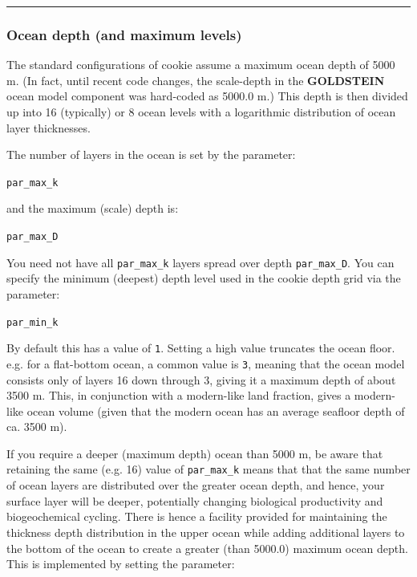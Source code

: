 \vspace{1mm}\noindent\rule{4cm}{0.5pt}\vspace{2mm}

\newpage

\subsubsection{Ocean depth (and maximum levels)}

The standard configurations of cookie assume a maximum ocean depth of 5000 m. (In fact, until recent code changes, the scale-depth in the \textbf{GOLDSTEIN} ocean model component was hard-coded as 5000.0 m.) This depth is then divided up into 16 (typically) or 8 ocean levels with a logarithmic distribution of ocean layer thicknesses.

The number of layers in the ocean is set by the parameter:

\vspace{1mm}
\texttt{par\_max\_k}
\vspace{1mm}

\noindent and the maximum (scale) depth is:

\vspace{1mm}
\texttt{par\_max\_D}
\vspace{1mm}

You need not have all \texttt{par\_max\_k} layers spread over depth \texttt{par\_max\_D}. You can specify the minimum (deepest) depth level used in the cookie depth grid via the parameter:

\vspace{1mm}
\texttt{par\_min\_k}
\vspace{1mm}

\noindent By default this has a value of \texttt{1}. Setting a high value truncates the ocean floor. e.g. for a flat-bottom ocean, a common value is \texttt{3}, meaning that the ocean model consists only of layers 16 down through 3, giving it a maximum depth of about 3500 m. This, in conjunction with a modern-like land fraction, gives a modern-like ocean volume (given that the modern ocean has an average seafloor depth of ca. 3500 m).

If you require a deeper (maximum depth) ocean than 5000 m, be aware that retaining the same (e.g. 16) value of \texttt{par\_max\_k} means that that the same number of ocean layers are distributed over the greater ocean depth, and hence, your surface layer will be deeper, potentially changing biological productivity and biogeochemical cycling. There is hence a facility provided for maintaining the thickness depth distribution in the upper ocean while adding additional layers to the bottom of the ocean to create a greater (than 5000.0) maximum ocean depth. This is implemented by setting the parameter:

